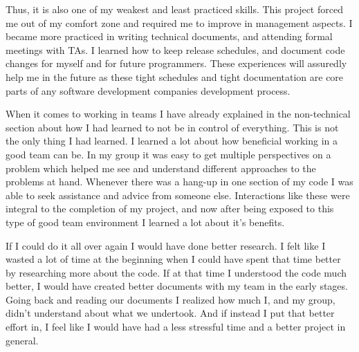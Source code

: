 \documentclass[10pt,journal,compsoc,draftclsnofoot]{IEEEtran}
\begin{document}
\begin{flushleft}
Thus, it is also one of my weakest and least practiced skills.
This project forced me out of my comfort zone and required me to improve in management aspects.
I became more practiced in writing technical documents, and attending formal meetings with TAs.
I learned how to keep release schedules, and document code changes for myself and for future programmers.
These experiences will assuredly help me in the future as these tight schedules and tight documentation are core parts of any software development companies development process.\par
When it comes to working in teams I have already explained in the non-technical section about how I had learned to not be in control of everything.
This is not the only thing I had learned.
I learned a lot about how beneficial working in a good team can be.
In my group it was easy to get multiple perspectives on a problem which helped me see and understand different approaches to the problems at hand.
Whenever there was a hang-up in one section of my code I was able to seek assistance and advice from someone else.
Interactions like these were integral to the completion of my project, and now after being exposed to this type of good team environment I learned a lot about it's benefits. \par
\vspace{3mm}
If I could do it all over again I would have done better research.
I felt like I wasted a lot of time at the beginning when I could have spent that time better by researching more about the code.
If at that time I understood the code much better, I would have created better documents with my team in the early stages.
Going back and reading our documents I realized how much I, and my group, didn't understand about what we undertook.
And if instead I put that better effort in, I feel like I would have had a less stressful time and a better project in general.

\end{flushleft}
\end{document}
